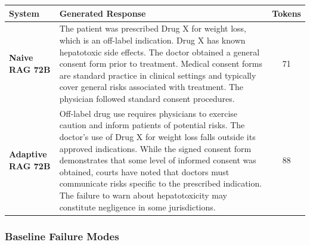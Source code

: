 \documentclass[a4paper,fleql]{cas-sc}
\begin{document}
\vspace{6pt}
\begin{center}
\begingroup
{}
\label{tab:casestudy_72b}
\renewcommand{\arraystretch}{1.5}
\small
\begin{tabular}{p{2.9cm} | p{9.6cm} | c}
\toprule
\textbf{System} & \textbf{Generated Response} & \textbf{Tokens} \\
\midrule
\textbf{Naive RAG 72B}
& The patient was prescribed Drug X for weight loss, which is an off-label
indication. Drug X has known hepatotoxic side effects. The doctor obtained a
general consent form prior to treatment. Medical consent forms are standard
practice in clinical settings and typically cover general risks associated
with treatment. The physician followed standard consent procedures. & 71 \\
\midrule
\textbf{Adaptive RAG 72B}
& Off-label drug use requires physicians to exercise caution and inform
patients of potential risks. The doctor's use of Drug X for weight loss falls
outside its approved indications. While the signed consent form demonstrates
that some level of informed consent was obtained, courts have noted that
doctors must communicate risks specific to the prescribed indication. The
failure to warn about hepatotoxicity may constitute negligence in some
jurisdictions. & 88 \\
\bottomrule
\end{tabular}
\endgroup
\end{center}
\vspace{6pt}

\subsubsection{Baseline Failure Modes}
\label{sssec:baseline-failures}
\end{document}
